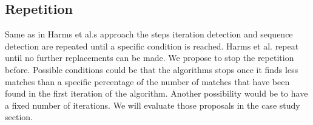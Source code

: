 \subsection{Repetition}
Same as in Harms et al.s approach the steps iteration detection and sequence detection are repeated until a specific condition is reached.
Harms et al. repeat until no further replacements can be made.
We propose to stop the repetition before.
Possible conditions could be that the algorithms stops once it finds less matches than a specific percentage of the number of matches that have been found in the first iteration of the algorithm.
Another possibility would be to have a fixed number of iterations.
We will evaluate those proposals in the case study section.
